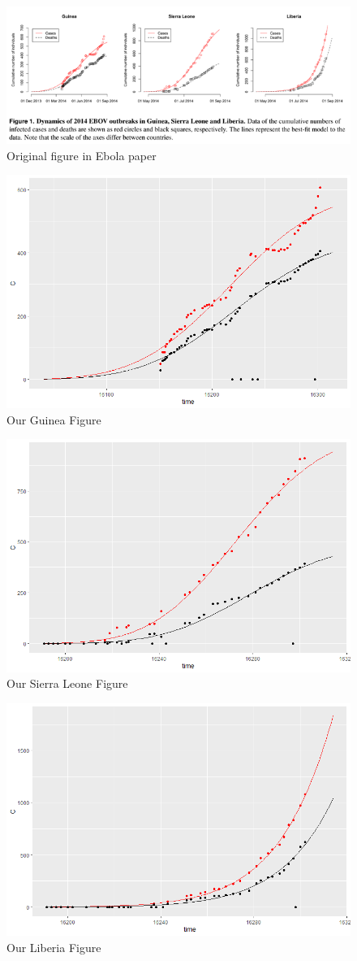 \begin{figure}[h]
\centering
\includegraphics[width=1\linewidth]{./figures/original_figure_SEIR_paper}
\caption{Original figure in Ebola paper}
\label{fig:original_figure_SEIR_paper}
\end{figure}

\begin{figure}[h]
\centering
\includegraphics[width=0.7\linewidth]{./figures/my_fit_Gui}
\caption{Our Guinea Figure}
\label{fig:my_fit_Gui}
\end{figure}

\begin{figure}[h]
\centering
\includegraphics[width=0.7\linewidth]{./figures/my_fit_SL}
\caption{Our Sierra Leone Figure}
\label{fig:my_fit_SL}
\end{figure}

\begin{figure}[h]
\centering
\includegraphics[width=0.7\linewidth]{./figures/my_fit_Lib}
\caption{Our Liberia Figure}
\label{fig:my_fit_Lib}
\end{figure}

